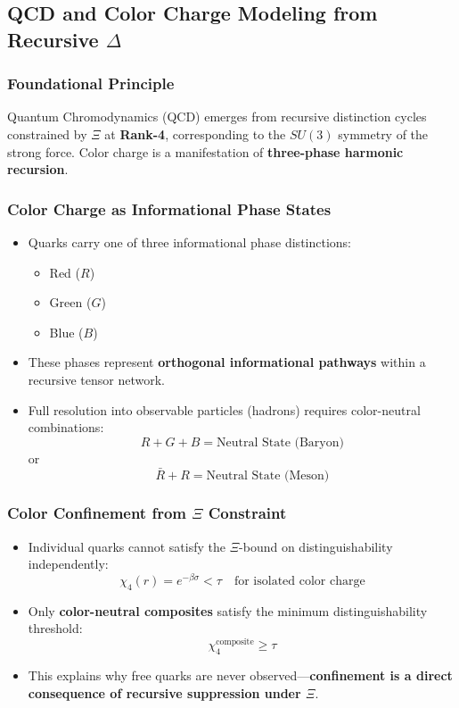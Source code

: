 \documentclass[12pt,a4paper]{article}
\begin{document}
\subsection{QCD and Color Charge Modeling from Recursive \(\Delta\)}

\subsubsection*{Foundational Principle}

Quantum Chromodynamics (QCD) emerges from recursive distinction cycles constrained by \(\Xi\) at \textbf{Rank-4}, corresponding to the \(SU(3)\) symmetry of the strong force. Color charge is a manifestation of \textbf{three-phase harmonic recursion}.

\subsubsection*{Color Charge as Informational Phase States}

\begin{itemize}
    \item Quarks carry one of three informational phase distinctions:
    \begin{itemize}
        \item Red (\(R\))
        \item Green (\(G\))
        \item Blue (\(B\))
    \end{itemize}
    \item These phases represent \textbf{orthogonal informational pathways} within a recursive tensor network.
    \item Full resolution into observable particles (hadrons) requires color-neutral combinations:
    \[
    R + G + B = \text{Neutral State (Baryon)}
    \]
    or
    \[
    \bar{R} + R = \text{Neutral State (Meson)}
    \]
\end{itemize}

\subsubsection*{Color Confinement from \(\Xi\) Constraint}

\begin{itemize}
    \item Individual quarks cannot satisfy the \(\Xi\)-bound on distinguishability independently:
    \[
    \chi_4(r) = e^{-\beta \sigma} < \tau \quad \text{for isolated color charge}
    \]
    \item Only \textbf{color-neutral composites} satisfy the minimum distinguishability threshold:
    \[
    \chi_4^{\text{composite}} \geq \tau
    \]
    \item This explains why free quarks are never observed—\textbf{confinement is a direct consequence of recursive suppression under \(\Xi\)}.
\end{itemize}
\end{document}
